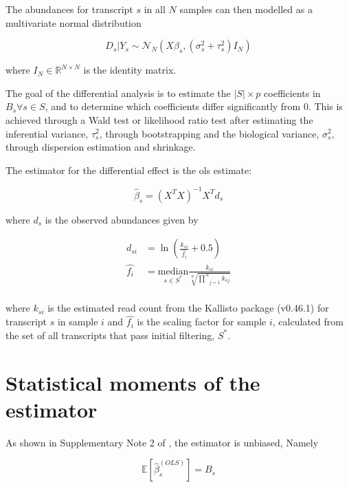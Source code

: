 The abundances for transcript $s$ in all $N$ samples can then modelled as a multivariate normal distribution

\begin{equation}
  D_{s} | Y_{s} \sim \mathcal{N}_N(X \beta_s, (\sigma_s^2 + \tau_s^2)I_{N})
\end{equation}

where $I_N \in \mathbb{R}^{N \times N}$ is the identity matrix.

The goal of the differential analysis is to estimate the $|S| \times p$ coefficients in $B_s \forall s \in S$, and to determine which coefficients differ significantly from 0.
This is achieved through a Wald test or likelihood ratio test after estimating the inferential variance, $\tau_s^2$, through bootstrapping and the biological variance, $\sigma_s^2$, through dispersion estimation and shrinkage.

The estimator for the differential effect is the \gls{ols} estimate:

\begin{equation*}
  \hat{\beta}_s = (X^TX)^{-1} X^T d_s
\end{equation*}

where $d_s$ is the observed abundances given by

\begin{align*}
  d_{si} &= \ln \left(\frac{k_{si}}{\hat{f_i}} + 0.5 \right) \\
  \hat{f_i} &= \underset{s \in S^*}{\mathrm{median}} \frac{k_{si}}{\sqrt[N]{\underset{j = 1}{\overset{N}{\prod }}k_{sj}}} \\
\end{align*}

where $k_{si}$ is the estimated read count from the Kallisto package (v0.46.1) \cite{brayNearoptimalProbabilisticRNAseq2016} for transcript $s$ in sample $i$ and $\hat{f_i}$ is the scaling factor for sample $i$, calculated from the set of all transcripts that pass initial filtering, $S^*$.

\section{Statistical moments of the  estimator}

As shown in Supplementary Note 2 of \cite[REF][]{pimentelDifferentialAnalysisRNAseq2017}, the estimator is unbiased, Namely

\begin{equation}
  \mathbb{E} \left[ \hat{\beta}_s^{(OLS)} \right] = B_s
\end{equation}

